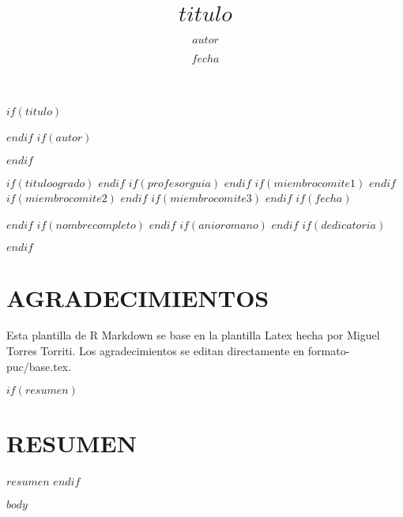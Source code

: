 \documentclass[12pt,reqno,oneside,pdftex]{formato-puc/puctesis} %
\begin{document}
$if(titulo)$
\title{$titulo$}
$endif$
$if(autor)$
\author{$autor$}
$endif$

$if(tituloogrado)$
$endif$
$if(profesorguia)$
$endif$
$if(miembrocomite1)$
$endif$
$if(miembrocomite2)$
$endif$
$if(miembrocomite3)$
$endif$
$if(fecha)$
\date         {$fecha$}
$endif$
$if(nombrecompleto)$
$endif$
$if(anioromano)$
$endif$
$if(dedicatoria)$
\dedication   {$dedicatoria$}
$endif$

\PageNumbersFootCentered
{}
\maketitle

\chapter*{AGRADECIMIENTOS}
Esta plantilla de R Markdown se base en la plantilla Latex hecha por
Miguel Torres Torriti. Los agradecimientos se editan directamente en formato-puc/base.tex.
\par

\cleardoublepage
\tableofcontents
\listoffigures          
\listoftables           
\cleardoublepage

$if(resumen)$
\chapter*{RESUMEN}
$resumen$
$endif$

\cleardoublepage %

\NoChapterPageNumber           %

$body$
\end{document}
